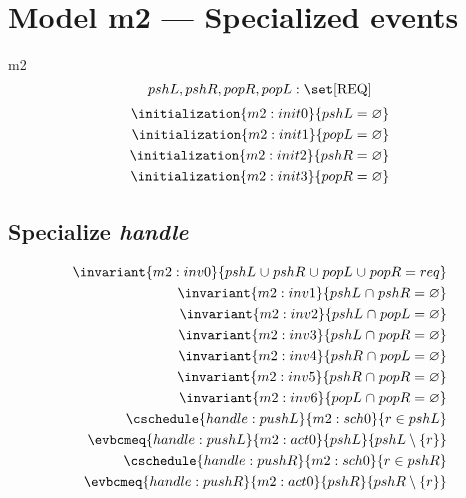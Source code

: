 \documentclass[12pt]{amsart}
\newcommand{\REQ}{\text{REQ}}
\begin{document}
\section{Model m2 --- Specialized events}
\begin{machine}{m2}
  \[ \variable{pshL,pshR,popR,popL : \set [\REQ]} \]
  \begin{align}
    \initialization{m2:init0}{pshL = \emptyset} \\
    \initialization{m2:init1}{popL = \emptyset} \\
    \initialization{m2:init2}{pshR = \emptyset} \\
    \initialization{m2:init3}{popR = \emptyset} 
  \end{align}
  \subsection{Specialize \emph{handle}}
  \begin{align}
    \invariant{m2:inv0}{ pshL \bunion 
        pshR \bunion 
        popL \bunion 
        popR 
        = req } \\
    \invariant{m2:inv1}{ pshL \binter pshR = \emptyset } \\
    \invariant{m2:inv2}{ pshL \binter popL = \emptyset } \\
    \invariant{m2:inv3}{ pshL \binter popR = \emptyset } \\
    \invariant{m2:inv4}{ pshR \binter popL = \emptyset } \\
    \invariant{m2:inv5}{ pshR \binter popR = \emptyset } \\
    \invariant{m2:inv6}{ popL \binter popR = \emptyset } \\
    \cschedule{handle:pushL}{m2:sch0}{ r \in pshL } \\
    \evbcmeq{handle:pushL}{m2:act0}{pshL}{pshL \setminus \{ r \}} \\
    \cschedule{handle:pushR}{m2:sch0}{ r \in pshR } \\
    \evbcmeq{handle:pushR}{m2:act0}{pshR}{pshR \setminus \{ r \}} \\

\end{align}
\end{machine}
\end{document}
